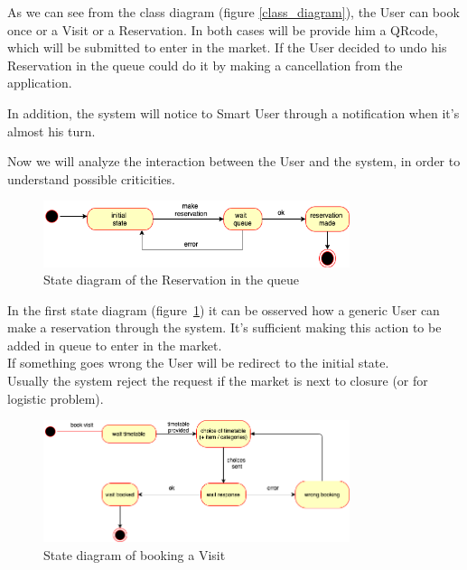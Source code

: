 \par 
\medskip
As we can see from the class diagram (figure \ref{class_diagram}), the User can book once or a Visit or a Reservation.
In both cases will be provide him a QRcode, which will be submitted to enter in the market. 
If the User decided to undo his Reservation in the queue could do it by making a cancellation from the application. 
\par
\medskip

In addition, the system will notice to Smart User through a notification  when it's almost his turn.

Now we will analyze the interaction between the User and the system, in order to understand possible criticities.
\par 
\bigskip

\begin{figure}[h]
  \caption{State diagram of the Reservation in the queue}
  \label{fig:Reservation}
  \centering
  \includegraphics[width=0.8\textwidth, height=0.2\textwidth]{diagrams/2-reservation.png}

\end{figure}
\par 
\medskip

In the first state diagram (figure~\ref{fig:Reservation}) it can be osserved how a generic User can make a reservation through the system. It's sufficient making this action to be added in queue to enter in the market.
\\If something goes wrong the User will be redirect to the initial state.
\\Usually the system reject the request if the market is next to closure (or for logistic problem).

\par 
\medskip

\begin{figure}[h]
  \caption{State diagram of booking a Visit}
  \label{fig:Visit}
  \centering
  \includegraphics[width=0.8\textwidth, height=0.4\textwidth]{diagrams/2-visit.png}
\end{figure}

